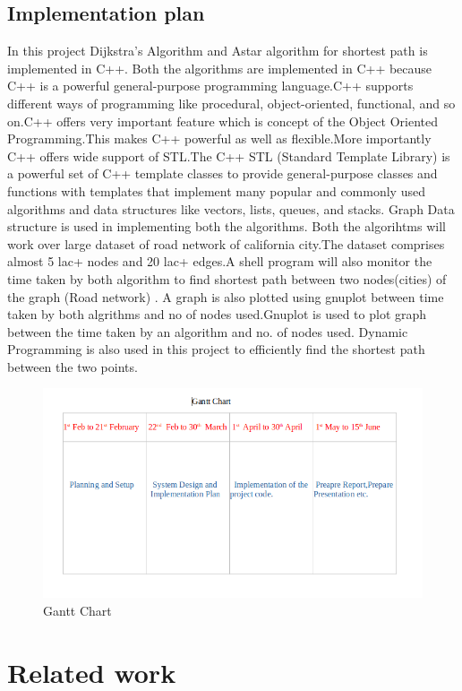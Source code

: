 \documentclass[14pt,a4]{extreport}
\begin{document}
\section{Implementation plan}
In this project Dijkstra's Algorithm and Astar algorithm for shortest path is implemented in C++.
Both the algorithms are implemented in C++ because C++ is a powerful general-purpose programming language.C++ supports different ways of programming like procedural, object-oriented, functional, and so on.C++ offers very important feature which is concept of the Object Oriented Programming.This makes C++ powerful as well as flexible.More importantly C++ offers wide support of STL.The C++ STL (Standard Template Library) is a powerful set of C++ template classes to provide general-purpose classes and functions with templates that implement many popular and commonly used algorithms and data structures like vectors, lists, queues, and stacks.
Graph Data structure is used in implementing both the algorithms.
Both the algorihtms will work over large dataset of road network of california city.The dataset comprises 
almost 5 lac+ nodes and 20 lac+ edges.A shell program will also monitor the time taken by both algorithm to find shortest path between two nodes(cities) of the graph (Road network) . A graph is also plotted using gnuplot between time taken by both algrithms and no of nodes used.Gnuplot is used to plot graph between the time taken by an algorithm and no. of nodes used.
Dynamic Programming is also used in this project to efficiently find the shortest path between the two points.
\begin{figure}
\centering
\includegraphics[width=0.95\linewidth]{images/ganttchart.png}
\caption{Gantt Chart}
\label{fig:1}
\end{figure}

\chapter{Related work}
\end{document}
